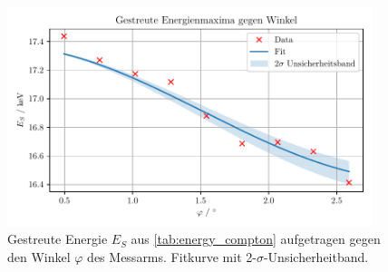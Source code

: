 \documentclass[ngerman]{scrartcl}
\begin{document}
\begin{figure}[H]
    \centering
    \begin{samepage}
        \includegraphics[width=0.95\textwidth]{../plots/energie_winkel.pdf} 
        \caption{Gestreute Energie $E_S$ aus \autoref{tab:energy_compton} aufgetragen gegen den Winkel $\varphi$ des Messarms. Fitkurve mit 2-$\sigma$-Unsicherheitband.}
        \label{fig:compton_energy}
    \end{samepage}
\end{figure}
\newpage
\end{document}
